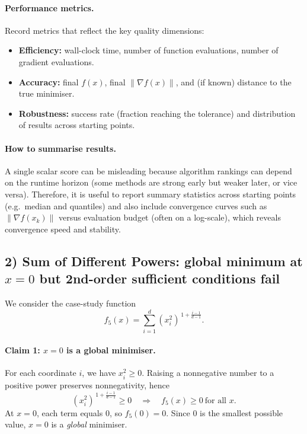\documentclass[12pt,a4paper]{article}
\begin{document}
\paragraph{Performance metrics.}
Record metrics that reflect the key quality dimensions:
\begin{itemize}
    \item \textbf{Efficiency:} wall-clock time, number of function evaluations, number of gradient evaluations.
    \item \textbf{Accuracy:} final $f(x)$, final $\|\nabla f(x)\|$, and (if known) distance to the true minimiser.
    \item \textbf{Robustness:} success rate (fraction reaching the tolerance) and distribution of results across starting points.
\end{itemize}

\paragraph{How to summarise results.}
A single scalar score can be misleading because algorithm rankings can depend on the runtime horizon (some methods are strong early but weaker later, or vice versa). Therefore, it is useful to report summary statistics across starting points (e.g.\ median and quantiles) and also include convergence curves such as $\|\nabla f(x_k)\|$ versus evaluation budget (often on a log-scale), which reveals convergence speed and stability.

\subsection*{2) Sum of Different Powers: global minimum at $x=0$ but 2nd-order sufficient conditions fail}

We consider the case-study function
\[
f_5(x)=\sum_{i=1}^{d}\left(x_i^2\right)^{\,1+\frac{i-1}{d-1}}.
\]

\paragraph{Claim 1: $x=0$ is a global minimiser.}
For each coordinate $i$, we have $x_i^2\ge 0$. Raising a nonnegative number to a positive power preserves nonnegativity, hence
\[
\left(x_i^2\right)^{\,1+\frac{i-1}{d-1}} \ge 0
\quad\Rightarrow\quad
f_5(x)\ge 0 \ \text{for all } x.
\]
At $x=0$, each term equals $0$, so $f_5(0)=0$. Since $0$ is the smallest possible value, $x=0$ is a \emph{global} minimiser.
\end{document}
